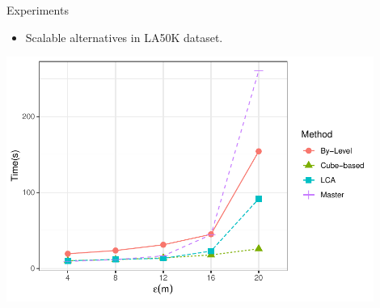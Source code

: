     \begin{frame}{Experiments}
        \begin{itemize}
            \item Scalable alternatives in LA50K dataset.
        \end{itemize} \vspace{0.25cm}

        \centering
        \includegraphics[width=0.9\textwidth]
                {../thesis/chapterPFlocks/figures/plots/08_sequential_parallel/la50k_e}
    \end{frame}
